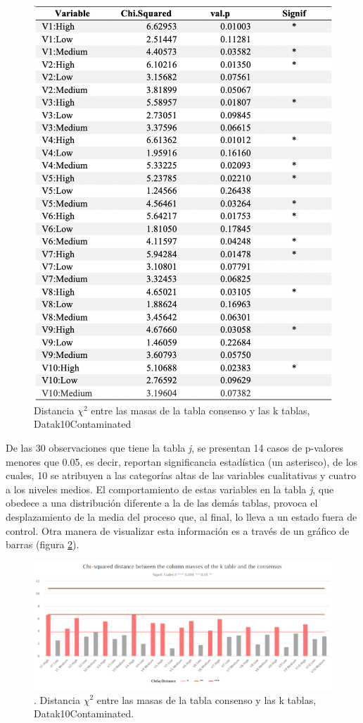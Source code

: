 \documentclass[water,article,submit,moreauthors,pdftex]{mdpi}
\begin{document}
\begin{figure}[!ht]



\begin{center}\includegraphics[width=0.6\linewidth,]{chitable} \end{center}

\caption{Distancia $\chi^2$ entre las masas de la tabla consenso y las k tablas, Datak10Contaminated}

\label{tab:chi}
\end{figure}

De las 30 observaciones que tiene la tabla \emph{j}, se presentan 14
casos de p-valores menores que 0.05, es decir, reportan significancia
estadística (un asterisco), de los cuales, 10 se atribuyen a las
categorías altas de las variables cualitativas y cuatro a los niveles
medios. El comportamiento de estas variables en la tabla \emph{j}, que
obedece a una distribución diferente a la de las demás tablas, provoca
el desplazamiento de la media del proceso que, al final, lo lleva a un
estado fuera de control. Otra manera de visualizar esta información es a
través de un gráfico de barras (figura \ref{fig:chibar}).

\begin{figure}[!ht]



\begin{center}\includegraphics[width=0.6\linewidth,]{chibar} \end{center}

\caption{. Distancia $\chi^2$ entre las masas de la tabla consenso y las k tablas, Datak10Contaminated.}

\label{fig:chibar}
\end{figure}
\end{document}
